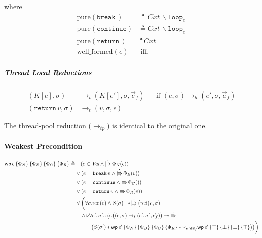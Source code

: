 \documentclass{article}
\numberwithin{algorithm}{section}
\newcommand{\progspec}[1]{\{ #1 \}}
\newcommand{\cloop}[1]{\texttt{loop}_{#1}\,}
\newcommand{\cbreak}{\texttt{break}\,}
\newcommand{\ccontinue}{\texttt{continue}}
\newcommand{\creturn}{\texttt{return}\,}
\newcommand{\pure}[1]{\text{pure}(#1)}
\newcommand{\wellf}[1]{\text{well\_formed}(#1)}
\newcommand{\hred}{\rightarrow_h}
\newcommand{\tred}{\rightarrow_t}
\newcommand{\tpred}{\rightarrow_{tp}}
\newcommand{\cred}{\text{red}}
\newcommand{\wand}{-\mkern-8mu*\,}
\newcommand{\upd}{\dot{|\mkern-8mu\Rrightarrow}\,}
\newcommand{\later}{\triangleright}
\newcommand{\wpre}[5]{\textsf{wp}\, #1\, \progspec{#2}\, \progspec{#3}\, \progspec{#4}\, \progspec{#5}}
\newcommand{\sep}{\,|\,}
\begin{document}
where
$$
\begin{aligned}
    \pure{\cbreak\!} &\triangleq \textit{Cxt}\,\backslash\cloop{e} \\
    \pure{\ccontinue} &\triangleq \textit{Cxt}\,\backslash\cloop{e} \\
    \pure{\creturn\!} &\triangleq \textit{Cxt} \\
    \wellf{e} &\text{ iff. } %
    \end{aligned}
$$

\subparagraph{Thread Local Reductions}

$$
\begin{aligned}
    (K[e], \sigma) &\tred (K[e'], \sigma, \vec{e}_f) && \text{if } (e, \sigma) \hred (e', \sigma, \vec{e}_f) \\
    (\creturn v, \sigma) &\tred (v, \sigma, \epsilon)
\end{aligned}
$$

The thread-pool reduction ($\tpred$) is identical to the original one.


\paragraph{Weakest Precondition}

$$
\begin{aligned}
    \wpre{e}{\Phi_N}{\Phi_B}{\Phi_C}{\Phi_R} \triangleq& \quad
           (e \in \textit{Val} \land \upd \Phi_N(e)) \\
    & \lor (e = \cbreak v \land \upd \Phi_B(v)) \\
    & \lor (e = \ccontinue \land \upd \Phi_C()) \\
    & \lor (e = \creturn v \land \upd \Phi_R(v)) \\
    & \lor \biggl(\forall \sigma. \cred(e) \land S(\sigma) \wand \upd \bigl(\cred(e, \sigma) \\
    & \quad \land \later
        \forall e', \sigma', \vec{e}_f. \bigl((e, \sigma) \tred (e', \sigma', \vec{e}_f)\bigr) \wand \upd \\
    & \quad\quad\quad \bigl(S(\sigma') * \wpre{e'}{\Phi_N}{\Phi_B}{\Phi_C}{\Phi_R} * \varhexstar_{e'\in\vec{e}_f} \wpre{e'}{\top}{\bot}{\bot}{\top} \bigr)\bigr)\biggr)
\end{aligned}
$$
\end{document}
